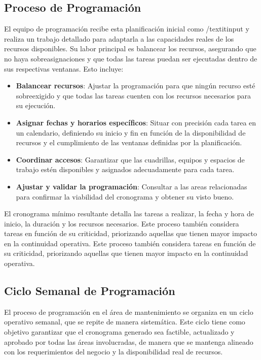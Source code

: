 \documentclass{article}
\begin{document}
\subsection{Proceso de Programación}

El equipo de programación recibe esta planificación inicial como /textit{input} y realiza un trabajo detallado para adaptarla a las capacidades reales de los recursos disponibles. Su labor principal es balancear los recursos, asegurando que no haya sobreasignaciones y que todas las tareas puedan ser ejecutadas dentro de sus respectivas ventanas. Esto incluye:

\begin{itemize} \item \textbf{Balancear recursos}: Ajustar la programación para que ningún recurso esté sobreexigido y que todas las tareas cuenten con los recursos necesarios para su ejecución. \item \textbf{Asignar fechas y horarios específicos}: Situar con precisión cada tarea en un calendario, definiendo su inicio y fin en función de la disponibilidad de recursos y el cumplimiento de las ventanas definidas por la planificación. \item \textbf{Coordinar accesos}: Garantizar que las cuadrillas, equipos y espacios de trabajo estén disponibles y asignados adecuadamente para cada tarea. \item \textbf{Ajustar y validar la programación}: Consultar a las areas relacionadas para confirmar la viabilidad del cronograma y obtener su visto bueno. \end{itemize}

El cronograma mínimo resultante detalla las tareas a realizar, la fecha y hora de inicio, la duración y los recursos necesarios. Este proceso también considera tareas en función de su criticidad, priorizando aquellas que tienen mayor impacto en la continuidad operativa. Este proceso también considera tareas en función de su criticidad, priorizando aquellas que tienen mayor impacto en la continuidad operativa.

\subsection{Ciclo Semanal de Programación}

El proceso de programación en el área de mantenimiento se organiza en un ciclo operativo semanal, que se repite de manera sistemática. Este ciclo tiene como objetivo garantizar que el cronograma generado sea factible, actualizado y aprobado por todas las áreas involucradas, de manera que se mantenga alineado con los requerimientos del negocio y la disponibilidad real de recursos.
\end{document}
